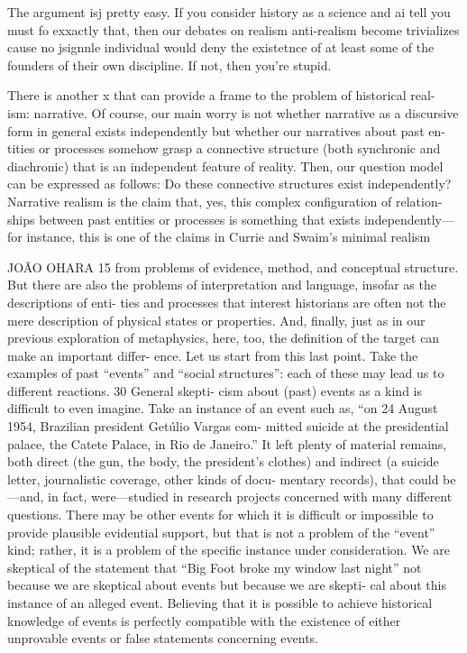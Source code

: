 The argument isj pretty easy. If you consider history as a science and ai tell you must fo exxactly that, then our debates on realism anti-realism become trivializes cause no jsignnle individual would deny the existetnce of at least some of the founders of their  own discipline. If not, then you're stupid.


There is another x that can provide a frame to the problem of historical real-
ism: narrative. Of course, our main worry is not whether narrative as a discursive
form in general exists independently but whether our narratives about past en-
tities or processes somehow grasp a connective structure (both synchronic and
diachronic) that is an independent feature of reality. Then, our question model
can be expressed as follows: Do these connective structures exist independently?
Narrative realism is the claim that, yes, this complex configuration of relation-
ships between past entities or processes is something that exists independently—
for instance, this is one of the claims in Currie and Swaim’s minimal realism

JOÃO OHARA 15
from problems of evidence, method, and conceptual structure. But there are also
the problems of interpretation and language, insofar as the descriptions of enti-
ties and processes that interest historians are often not the mere description of
physical states or properties. And, finally, just as in our previous exploration of
metaphysics, here, too, the definition of the target can make an important differ-
ence.
Let us start from this last point. Take the examples of past “events” and “social
structures”: each of these may lead us to different reactions. 30 General skepti-
cism about (past) events as a kind is difficult to even imagine. Take an instance of
an event such as, “on 24 August 1954, Brazilian president Getúlio Vargas com-
mitted suicide at the presidential palace, the Catete Palace, in Rio de Janeiro.”
It left plenty of material remains, both direct (the gun, the body, the president’s
clothes) and indirect (a suicide letter, journalistic coverage, other kinds of docu-
mentary records), that could be—and, in fact, were—studied in research projects
concerned with many different questions. There may be other events for which it
is difficult or impossible to provide plausible evidential support, but that is not a
problem of the “event” kind; rather, it is a problem of the specific instance under
consideration. We are skeptical of the statement that “Big Foot broke my window
last night” not because we are skeptical about events but because we are skepti-
cal about this instance of an alleged event. Believing that it is possible to achieve
historical knowledge of events is perfectly compatible with the existence of either
unprovable events or false statements concerning events.


